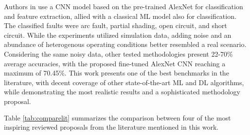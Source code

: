 Authors in \cite{Krizhevsky2012} use a CNN model based on the pre-trained AlexNet for classification and feature extraction, allied with a classical ML model also for classification. The classified faults were arc fault, partial shading, open circuit, and short circuit. While the experiments utilized simulation data, adding noise and an abundance of heterogenous operating conditions better resembled a real scenario. Considering the same noisy data, other tested methodologies present 22-70\% average accuracies, with the proposed fine-tuned AlexNet CNN reaching a maximum of 70.45\%. This work presents one of the best benchmarks in the literature, with decent coverage of other state-of-the-art ML and DL algorithms, while demonstrating the most realistic results and a sophisticated methodology proposal.

Table \ref{tab:comparelit} summarizes the comparison between four of the most inspiring reviewed proposals from the literature mentioned in this work.

